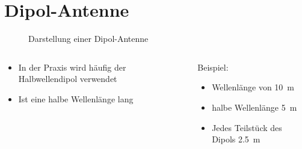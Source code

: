 
\section{Dipol-Antenne}
\label{section:dipol}
\begin{frame}%

\begin{figure}
    \caption{\scriptsize Darstellung einer Dipol-Antenne}
    \label{n_dipol}
\end{figure}
\begin{columns}
    \begin{column}{0.48\textwidth}
    \begin{itemize}
  \item In der Praxis wird häufig der Halbwellendipol verwendet
  \item Ist eine halbe Wellenlänge lang
  \end{itemize}

    \end{column}
   \begin{column}{0.48\textwidth}
       
    \pause
    Beispiel:

\begin{itemize}
  \item Wellenlänge von \qty{10}{\metre}
  \item halbe Wellenlänge \qty{5}{\metre}
  \item Jedes Teilstück des Dipols \qty{2,5}{\metre}
  \end{itemize}



   \end{column}
\end{columns}

\end{frame}

\begin{frame}
\end{frame}

